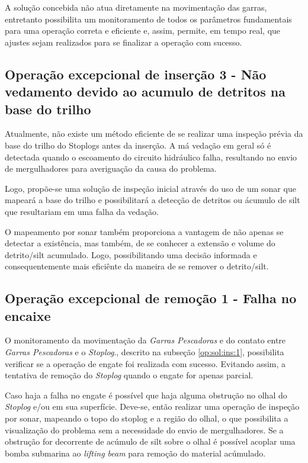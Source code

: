 A solução concebida não atua diretamente na movimentação das garras, entretanto possibilita um monitoramento de todos os
parâmetros fundamentais para uma operação correta e eficiente e, assim,  
permite, em tempo real, que ajustes sejam realizados para se finalizar a
operação com sucesso.


\subsection{Operação excepcional de inserção 3 - Não vedamento devido ao acumulo de detritos na base do trilho}

Atualmente, não existe um método eficiente de se realizar uma inspeção prévia da base do trilho do Stoplogs antes da inserção. A má vedação em geral só é detectada quando o escoamento do circuito hidráulico falha, resultando no envio de mergulhadores para averiguação da causa do problema. 

Logo, propõe-se uma solução de inspeção inicial através do uso
de um sonar que mapeará a base do trilho e possibilitará a
detecção de detritos ou ácumulo de silt que resultariam em uma falha da vedação. 

O mapeamento por sonar também proporciona a vantagem de não apenas se detectar a existência, mas também, de se conhecer a extensão e volume do detrito/silt acumulado. Logo, possibilitando uma decisão informada e consequentemente mais eficiênte da maneira de se remover o detrito/silt. 


\subsection{Operação excepcional de remoção 1 - Falha no encaixe}

O monitoramento da movimentação da  \emph{Garras Pescadoras} e do contato entre \emph{Garras Pescadoras} e o \emph{Stoplog}., descrito na subseção
\ref{op:sol:ins:1}, possibilita verificar se a operação de engate foi realizada com sucesso. Evitando assim, a tentativa de remoção do \emph{Stoplog} quando o engate for apenas parcial. 


Caso haja a falha no engate é possível que haja alguma obstrução no olhal do
\emph{Stoplog} e/ou em sua superfície. Deve-se, então realizar uma operação de
inspeção por sonar, mapeando o topo do stoplog e a região do olhal, o que possibilita a visualização do problema sem a necessidade do envio
de mergulhadores. Se a obstrução for decorrente de acúmulo de silt sobre o olhal é possível acoplar uma bomba submarina ao \emph{lifting beam} para remoção do material acúmulado. 

